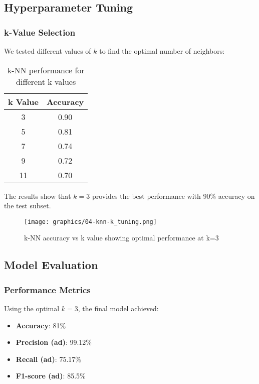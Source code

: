 \subsection{Hyperparameter Tuning}
\subsubsection{k-Value Selection}
We tested different values of $k$ to find the optimal number of neighbors:

\begin{table}[H]
\centering
\caption{k-NN performance for different k values}
\label{tab:knn-k-values}
\begin{tabular}{cc}
\toprule
\textbf{k Value} & \textbf{Accuracy} \\
\midrule
3 & 0.90 \\
5 & 0.81 \\
7 & 0.74 \\
9 & 0.72 \\
11 & 0.70 \\
\bottomrule
\end{tabular}
\end{table}

The results show that $k = 3$ provides the best performance with 90\% accuracy on the test subset.

\begin{figure}[H]
\centering
\texttt{[image: graphics/04-knn-k\_tuning.png]}
\caption{k-NN accuracy vs k value showing optimal performance at k=3}
\label{fig:knn-k-tuning}
\end{figure}

\subsection{Model Evaluation}
\subsubsection{Performance Metrics}
Using the optimal $k = 3$, the final model achieved:

\begin{itemize}
    \item \textbf{Accuracy}: 81\%
    \item \textbf{Precision (ad)}: 99.12\%
    \item \textbf{Recall (ad)}: 75.17\%
    \item \textbf{F1-score (ad)}: 85.5\%
\end{itemize}

